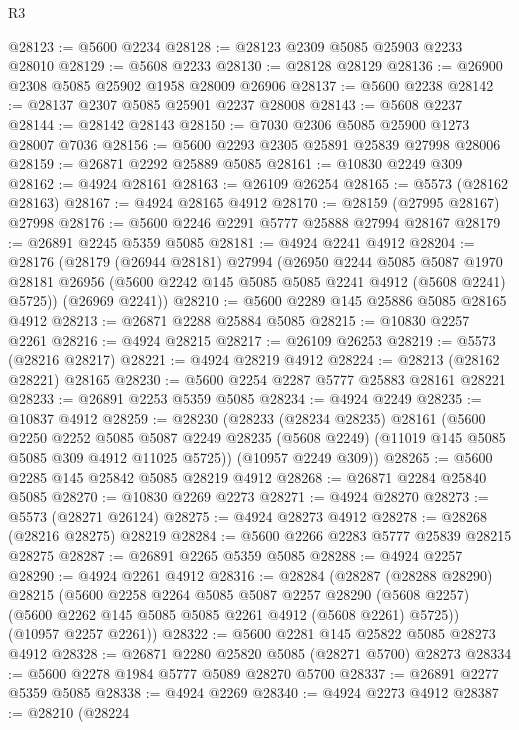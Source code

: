 \begin{lexlean}{R3}
\begin{coremodule}
@28123 := @5600 @2234
@28128 := @28123 @2309 @5085 @25903 @2233 @28010
@28129 := @5608 @2233
@28130 := @28128 @28129
@28136 := @26900 @2308 @5085 @25902 @1958 @28009 @26906
@28137 := @5600 @2238
@28142 := @28137 @2307 @5085 @25901 @2237 @28008
@28143 := @5608 @2237
@28144 := @28142 @28143
@28150 := @7030 @2306 @5085 @25900 @1273 @28007 @7036
@28156 := @5600 @2293 @2305 @25891 @25839 @27998 @28006
@28159 := @26871 @2292 @25889 @5085
@28161 := @10830 @2249 @309
@28162 := @4924 @28161
@28163 := @26109 @26254
@28165 := @5573 (@28162 @28163)
@28167 := @4924 @28165 @4912
@28170 := @28159 (@27995 @28167) @27998
@28176 := @5600 @2246 @2291 @5777 @25888 @27994 @28167
@28179 := @26891 @2245 @5359 @5085
@28181 := @4924 @2241 @4912
@28204 := @28176
    (@28179
      (@26944 @28181)
      @27994
      (@26950
        @2244
        @5085
        @5087
        @1970
        @28181
        @26956
        (@5600 @2242 @145 @5085 @5085 @2241 @4912 (@5608 @2241) @5725))
      (@26969 @2241))
@28210 := @5600 @2289 @145 @25886 @5085 @28165 @4912
@28213 := @26871 @2288 @25884 @5085
@28215 := @10830 @2257 @2261
@28216 := @4924 @28215
@28217 := @26109 @26253
@28219 := @5573 (@28216 @28217)
@28221 := @4924 @28219 @4912
@28224 := @28213 (@28162 @28221) @28165
@28230 := @5600 @2254 @2287 @5777 @25883 @28161 @28221
@28233 := @26891 @2253 @5359 @5085
@28234 := @4924 @2249
@28235 := @10837 @4912
@28259 := @28230
    (@28233
      (@28234 @28235)
      @28161
      (@5600
        @2250
        @2252
        @5085
        @5087
        @2249
        @28235
        (@5608 @2249)
        (@11019 @145 @5085 @5085 @309 @4912 @11025 @5725))
      (@10957 @2249 @309))
@28265 := @5600 @2285 @145 @25842 @5085 @28219 @4912
@28268 := @26871 @2284 @25840 @5085
@28270 := @10830 @2269 @2273
@28271 := @4924 @28270
@28273 := @5573 (@28271 @26124)
@28275 := @4924 @28273 @4912
@28278 := @28268 (@28216 @28275) @28219
@28284 := @5600 @2266 @2283 @5777 @25839 @28215 @28275
@28287 := @26891 @2265 @5359 @5085
@28288 := @4924 @2257
@28290 := @4924 @2261 @4912
@28316 := @28284
    (@28287
      (@28288 @28290)
      @28215
      (@5600
        @2258
        @2264
        @5085
        @5087
        @2257
        @28290
        (@5608 @2257)
        (@5600 @2262 @145 @5085 @5085 @2261 @4912 (@5608 @2261) @5725))
      (@10957 @2257 @2261))
@28322 := @5600 @2281 @145 @25822 @5085 @28273 @4912
@28328 := @26871 @2280 @25820 @5085 (@28271 @5700) @28273
@28334 := @5600 @2278 @1984 @5777 @5089 @28270 @5700
@28337 := @26891 @2277 @5359 @5085
@28338 := @4924 @2269
@28340 := @4924 @2273 @4912
@28387 := @28210
    (@28224

\end{coremodule}
\end{lexlean}
